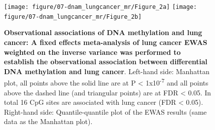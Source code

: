 \documentclass[11pt,twoside]{bristolthesis}
\newcommand{\blandscape}{\begin{landscape}}
\newcommand{\elandscape}{\end{landscape}}
\begin{document}
\blandscape
\begin{figure}[htbp]
\texttt{[image: figure/07-dnam\_lungcancer\_mr/Figure\_2a]} \texttt{[image: figure/07-dnam\_lungcancer\_mr/Figure\_2b]} \caption[Observational associations of DNA methylation and lung cancer: A fixed effects meta-analysis of lung cancer EWAS weighted on the inverse variance was performed to establish the observational association between differential DNA methylation and lung cancer]{\textbf{Observational associations of DNA methylation and lung cancer: A fixed effects meta-analysis of lung cancer EWAS weighted on the inverse variance was performed to establish the observational association between differential DNA methylation and lung cancer}. Left-hand side: Manhattan plot, all points above the solid line are at P \textless{} 1x10\textsuperscript{-7} and all points above the dashed line (and triangular points) are at FDR \textless{} 0.05. In total 16 CpG sites are associated with lung cancer (FDR \textless{} 0.05). Right-hand side: Quantile-quantile plot of the EWAS results (same data as the Manhattan plot).}\label{fig:fig2-07}
\end{figure}
\elandscape
\end{document}
